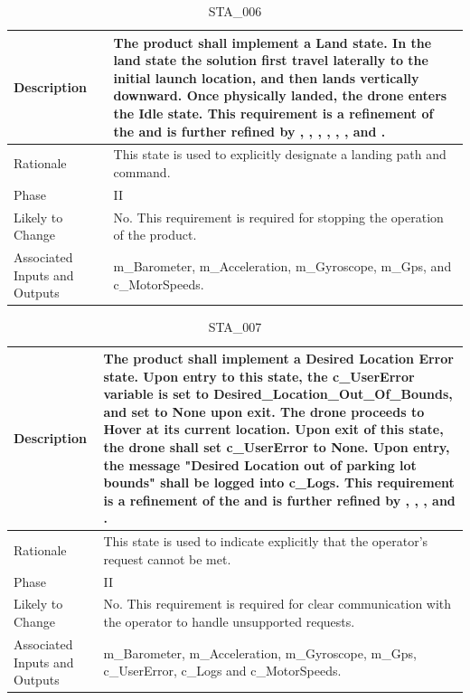 \documentclass{article}
\begin{document}
\begin{table}[!h]
\begin{center}
\caption {STA\_006} 
\label{STA_006}
\begin{tabular}{ | m{3cm} | m{11cm} | }
\hline
Description & The product shall implement a Land state. In the land state the solution first travel laterally to the initial launch location, and then lands vertically downward. Once physically landed, the drone enters the Idle state. This requirement is a refinement of the \nameref{Land State} and is further refined by \nameref{PERF_002}, \nameref{PERF_004}, \nameref{PERF_006}, \nameref{PERF_007}, \nameref{SAFE_001}, \nameref{SAFE_003}, and \nameref{USE_003}. \\
\hline
Rationale & This state is used to explicitly designate a landing path and command. \\
\hline
Phase & II \\
\hline
Likely to Change & No. This requirement is required for stopping the operation of the product. \\
\hline
Associated Inputs and Outputs & m\_Barometer, m\_Acceleration, m\_Gyroscope, m\_Gps, and c\_MotorSpeeds. \\
\hline
\end{tabular}
\end{center}
\end{table}

\begin{table}[!h]
\begin{center}
\caption {STA\_007} 
\label{STA_007}
\begin{tabular}{ | m{3cm} | m{11cm} | }
\hline
Description & The product shall implement a Desired Location Error state. Upon entry to this state, the c\_UserError variable is set to Desired_Location_Out_Of_Bounds, and set to None upon exit. The drone proceeds to Hover at its current location. Upon exit of this state, the drone shall set c\_UserError to None. Upon entry, the message "Desired Location out of parking lot bounds" shall be logged into c\_Logs. This requirement is a refinement of the \nameref{Desired Location Error State} and is further refined by \nameref{PERF_007}, \nameref{SAFE_001}, \nameref{SAFE_003}, and \nameref{USE_003}. \\
\hline
Rationale & This state is used to indicate explicitly that the operator's request cannot be met.  \\
\hline
Phase & II \\
\hline
Likely to Change & No. This requirement is required for clear communication with the operator to handle unsupported requests. \\
\hline
Associated Inputs and Outputs & m\_Barometer, m\_Acceleration, m\_Gyroscope, m\_Gps, c\_UserError, c\_Logs and c\_MotorSpeeds. \\
\hline
\end{tabular}
\end{center}
\end{table}
\end{document}
